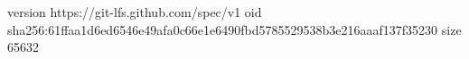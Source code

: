 version https://git-lfs.github.com/spec/v1
oid sha256:61ffaa1d6ed6546e49afa0c66e1e6490fbd5785529538b3e216aaaf137f35230
size 65632
